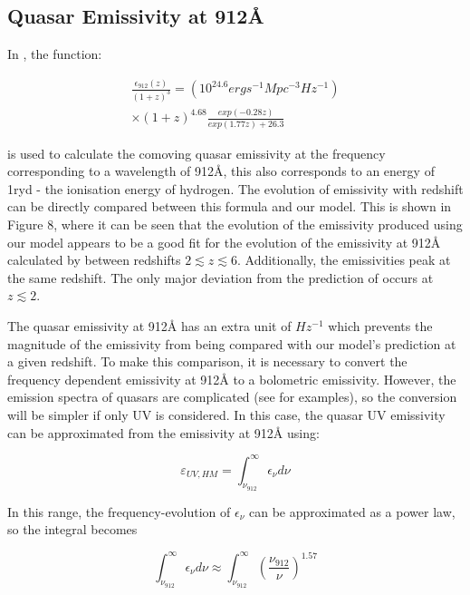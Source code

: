 \documentclass[12pt, twocolumn]{article}%
\begin{document}
\subsection{Quasar Emissivity at 912\AA}

In \cite{Haardt_Madau}, the function:

\begin{multline}
    \frac{\epsilon_{912}(z)}{(1+z)^3}=(10^{24.6}erg s^{-1}Mpc^{-3}Hz^{-1})\\
    \times(1+z)^{4.68}\frac{exp(-0.28z)}{exp(1.77z)+26.3}
\end{multline}

\noindent is used to calculate the comoving quasar emissivity at the frequency corresponding to a wavelength of 912\AA, this also corresponds to an energy of 1ryd - the ionisation energy of hydrogen. The evolution of emissivity with redshift can be directly compared between this formula and our model. This is shown in Figure 8, where it can be seen that the evolution of the emissivity produced using our model appears to be a good fit for the evolution of the emissivity at 912\AA \: calculated by \cite{Haardt_Madau} between redshifts $2\lesssim z\lesssim6$. Additionally, the emissivities peak at the same redshift. The only major deviation from the prediction of \citeauthor{Haardt_Madau} occurs at $z\lesssim2$.\par

The quasar emissivity at 912\AA \: has an extra unit of $Hz^{-1}$ which prevents the magnitude of the emissivity from being compared with our model's prediction at a given redshift. To make this comparison, it is necessary to convert the frequency dependent emissivity at 912\AA \: to a bolometric emissivity. However, the emission spectra of quasars are complicated (see \cite{QSO_Spectrum} for examples), so the conversion will be simpler if only UV is considered. In this case, the quasar UV emissivity can be approximated from the emissivity at 912\AA \: using:

\begin{equation}
    \varepsilon_{UV,HM}=\int_{\nu_{912}}^{\infty}\epsilon_\nu d\nu
\end{equation}

\noindent In this range, the frequency-evolution of $\epsilon_\nu$ can be approximated as a power law, so the integral becomes

\begin{equation}
    \int_{\nu_{912}}^{\infty}\epsilon_\nu d\nu\approx\int_{\nu_{912}}^{\infty}\left(\frac{\nu_{912}}{\nu}\right)^{1.57}
\end{equation}
\end{document}
